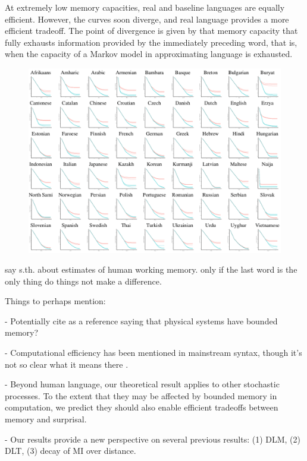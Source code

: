 \documentclass[11pt,letterpaper]{article}
\begin{document}
At extremely low memory capacities, real and baseline languages are equally efficient.
However, the curves soon diverge, and real language provides a more efficient tradeoff.
The point of divergence is given by that memory capacity that fully exhausts information provided by the immediately preceding word, that is, when the capacity of a Markov model in approximating language is exhausted.


\begin{figure}
\includegraphics[width=\textwidth]{figures/full-results.png}
	\caption{}\label{fig:results}
\end{figure}


say s.th. about estimates of human working memory. only if the last word is the only thing do things not make a difference.


Things to perhaps mention:

- Potentially cite \cite{PhysRevLett.115.098701} as a reference saying that physical systems have bounded memory?

- Computational efficiency has been mentioned in mainstream syntax, though it's not so clear what it means there \citep{chomsky2005three,hauser2002faculty}.

- Beyond human language, our theoretical result applies to other stochastic processes. To the extent that they may be affected by bounded memory in computation, we predict they should also enable efficient tradeoffs between memory and surprisal.

- Our results provide a new perspective on several previous results: (1) DLM, (2) DLT, (3) decay of MI over distance.
\end{document}
